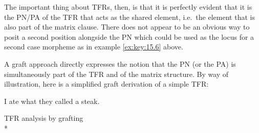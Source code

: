 \documentclass[output=paper]{langsci/langscibook}
\begin{document}
\begin{refcontext}
The important thing about \glspl{TFR}, then, is that it is perfectly evident
that it is the \gls{PN}/PA of the \gls{TFR} that acts as the shared element,
i.e.\ the element that is also part of the matrix clause. There does not appear
to be an obvious way to posit a second position alongside the \gls{PN} which
could be used as the locus for a second case morpheme as in example \eqref{ex:key:15.6} above.

A graft approach directly expresses the notion that the \gls{PN} (or the PA) is
simultaneously part of the \gls{TFR} and of the matrix structure. By way of
illustration, here is a simplified graft derivation of a simple \gls{TFR}:

\ea\label{ex:key:15.23}
    I ate what they called a steak.
\z

\ea\label{ex:key:15.24} TFR analysis by grafting\\*
\end{refcontext}
\end{document}
